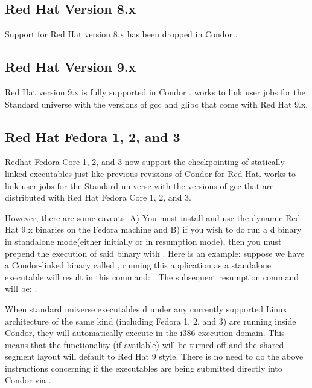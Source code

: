 \subsection{\label{sec:platform-linux-rh8}Red Hat Version 8.x}

Support for Red Hat version 8.x has been dropped in Condor \VersionNotice.


\subsection{\label{sec:platform-linux-rh9}Red Hat Version 9.x}

Red Hat version 9.x is fully supported in Condor \VersionNotice.
 works to link user jobs for the Standard universe
with the versions of gcc and glibc that come with Red Hat 9.x.

\subsection{\label{sec:platform-linux-fed}Red Hat Fedora 1, 2, and 3}

Redhat Fedora Core 1, 2, and 3 now support the checkpointing of statically
linked executables just like previous revisions of Condor for Red Hat.
 works to link user jobs for the Standard universe with
the versions of gcc that are distributed with Red Hat Fedora Core 1, 2,
and 3.

However, there are some caveats: A) You must install and use the dynamic
Red Hat 9.x binaries on the Fedora machine and B) if you wish to do
run a d binary in standalone mode(either initially
or in resumption mode), then you must prepend the execution of said
binary with . Here is an example: suppose we have a
Condor-linked binary called , running this application as a
standalone executable will result in this command: . The subsequent resumption command will be: 
.

When standard universe executables d under any currently
supported Linux architecture of the same kind (including Fedora 1,
2, and 3) are running inside Condor, they will automatically execute
in the i386 execution domain. This means that the 
functionality (if available) will be turned off and the shared segment
layout will default to Red Hat 9 style. There is no need to do the
above instructions concerning  if the executables are
being submitted directly into Condor via .





